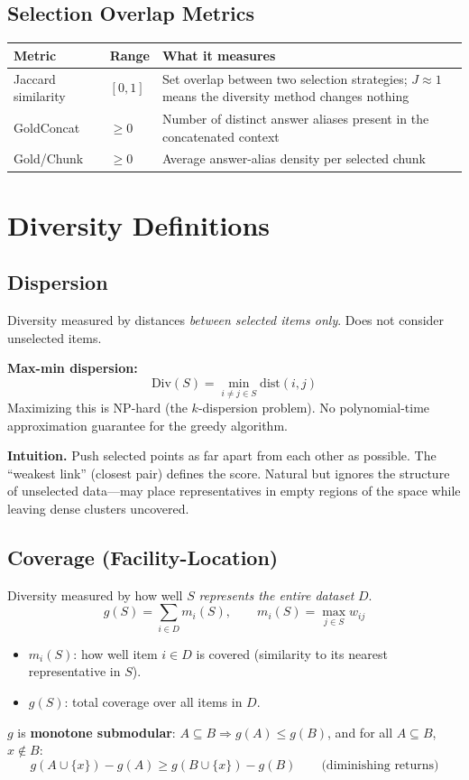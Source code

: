 \documentclass[11pt,a4paper]{article}
\begin{document}
\subsection*{Selection Overlap Metrics}

\begin{tabularx}{\textwidth}{@{}l l X@{}}
	\toprule
	\textbf{Metric}    & \textbf{Range} & \textbf{What it measures} \\
	\midrule
	Jaccard similarity & $[0,1]$ & Set overlap between two selection strategies; $J \approx 1$ means the diversity method changes nothing \\
	GoldConcat & $\geq 0$ & Number of distinct answer aliases present in the concatenated context \\
	Gold/Chunk & $\geq 0$ & Average answer-alias density per selected chunk \\
	\bottomrule
\end{tabularx}

\newpage

\section{Diversity Definitions}

\subsection{Dispersion}

Diversity measured by distances \emph{between selected items only}. Does not consider unselected items.

\textbf{Max-min dispersion:}
\[
	\mathrm{Div}(S) = \min_{i \neq j \in S} \mathrm{dist}(i, j)
\]
Maximizing this is NP-hard (the $k$-dispersion problem). No polynomial-time approximation guarantee for the greedy algorithm.

\textbf{Intuition.} Push selected points as far apart from each other as possible. The ``weakest link'' (closest pair) defines the score. Natural but ignores the structure of unselected data---may place representatives in empty regions of the space while leaving dense clusters uncovered.

\subsection{Coverage (Facility-Location)}

Diversity measured by how well $S$ \emph{represents the entire dataset} $D$.
\[
	g(S) = \sum_{i \in D} m_i(S), \qquad m_i(S) = \max_{j \in S} w_{ij}
\]
\begin{itemize}
	\item $m_i(S)$: how well item $i \in D$ is covered (similarity to its nearest representative in $S$).
	\item $g(S)$: total coverage over all items in $D$.
\end{itemize}
$g$ is \textbf{monotone submodular}: $A \subseteq B \Rightarrow g(A) \leq g(B)$, and for all $A \subseteq B$, $x \notin B$:
\[
	g(A \cup \{x\}) - g(A) \geq g(B \cup \{x\}) - g(B) \qquad \text{(diminishing returns)}
\]
\end{document}
